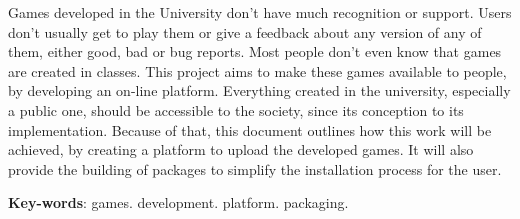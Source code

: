 \begin{resumo}[Abstract]
Games developed in the University don't have much recognition or support. Users don't usually get to play them or give a feedback about any version of any of them, either good, bad or bug reports. Most people don't even know that games are created in classes. This project aims to make these games available to people, by developing an on-line platform. Everything created in the university, especially a public one, should be accessible to the society, since its conception to its implementation. Because of that, this document outlines how this work will be achieved, by creating a platform to upload the developed games. It will also provide the building of packages to simplify the installation process for the user.

   \vspace{\onelineskip}

   \noindent
   \textbf{Key-words}: games. development. platform. packaging.
\end{resumo}
